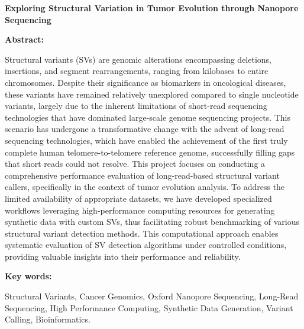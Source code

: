 \begin{center}
    \Large\bfseries Exploring Structural Variation in Tumor Evolution through 
    Nanopore Sequencing

\end{center} 

\vspace{0.5cm}
    \noindent\textbf{\large Abstract:}

    Structural variants (SVs) are genomic alterations encompassing deletions, 
    insertions, and segment rearrangements, ranging from kilobases to entire 
    chromosomes. Despite their significance as biomarkers in oncological 
    diseases, these variants have remained relatively unexplored compared to 
    single nucleotide variants, largely due to the inherent limitations of 
    short-read sequencing technologies that have dominated large-scale genome 
    sequencing projects. This scenario has undergone a transformative change 
    with the advent of long-read sequencing technologies, which have enabled 
    the achievement of the first truly complete human telomere-to-telomere 
    reference genome, successfully filling gaps that short reads could not 
    resolve. This project focuses on conducting a comprehensive performance 
    evaluation of long-read-based structural variant callers, specifically in 
    the context of tumor evolution analysis. To address the limited availability
    of appropriate datasets, we have developed specialized workflows leveraging 
    high-performance computing resources for generating synthetic data with 
    custom SVs, thus facilitating robust benchmarking of various structural 
    variant detection methods. This computational approach enables systematic 
    evaluation of SV detection algorithms under controlled conditions, 
    providing valuable insights into their performance and reliability.


\vspace{0.5cm}
    \noindent\textbf{\large Key words:} 
    
    Structural Variants, Cancer Genomics, Oxford Nanopore Sequencing, Long-Read 
    Sequencing, High Performance Computing, Synthetic Data Generation, Variant 
    Calling, Bioinformatics.

